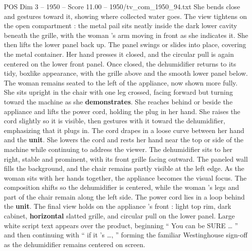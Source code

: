 \begin{textsample}{POS Dim 3 – 1950 – Score 11.00 – 1950/tv\_com\_1950\_94.txt}
She bends close and gestures toward it, showing where collected water goes.
The view tightens on the open compartment : the metal pail sits neatly inside the dark lower cavity beneath the grille, with the woman ’s arm moving in front as she indicates it.
She then lifts the lower panel back up.
The panel swings or slides into place, covering the metal container.
Her hand presses it closed, and the circular pull is again centered on the lower front panel.
Once closed, the dehumidifier returns to its tidy, boxlike appearance, with the grille above and the smooth lower panel below.
The woman remains seated to the left of the appliance, now shown more fully.
She sits upright in the chair with one leg crossed, facing forward but turning toward the machine as she \textbf{demonstrates}.
She reaches behind or beside the appliance and lifts the power cord, holding the plug in her hand.
She raises the cord slightly so it is visible, then gestures with it toward the dehumidifier, emphasizing that it plugs in.
The cord drapes in a loose curve between her hand and the \textbf{unit}.
She lowers the cord and rests her hand near the top or side of the machine while continuing to address the viewer.
The dehumidifier sits to her right, stable and prominent, with its front grille facing outward.
The paneled wall fills the background, and the chair remains partly visible at the left edge.
As the woman sits with her hands together, the appliance becomes the visual focus.
The composition shifts so the dehumidifier is centered, while the woman ’s legs and part of the chair remain along the left side.
The power cord lies in a loop behind the \textbf{unit}.
The final view holds on the appliance ’s front : light top rim, dark cabinet, \textbf{horizontal} slatted grille, and circular pull on the lower panel.
Large white script text appears over the product, beginning “ You can be SURE … ” and then continuing with “ if it ’s …, ” forming the familiar Westinghouse sign-off as the dehumidifier remains centered on screen.

\end{textsample}
